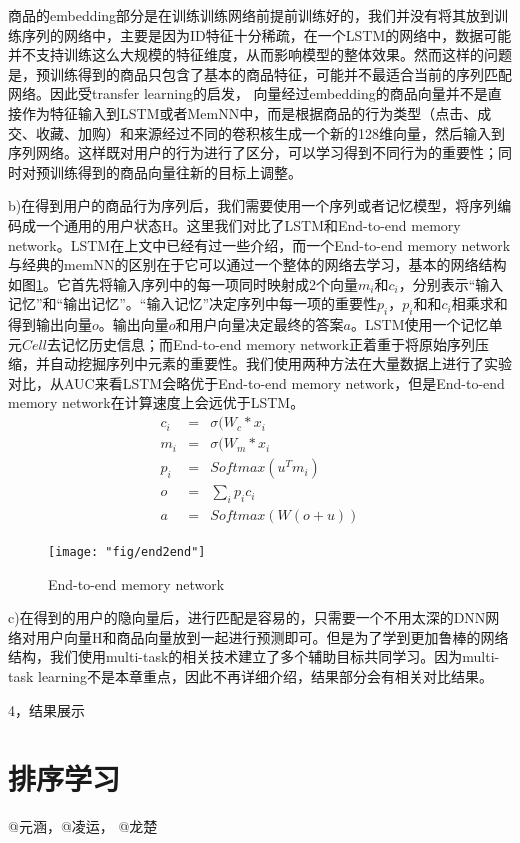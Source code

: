 商品的embedding部分是在训练训练网络前提前训练好的，我们并没有将其放到训练序列的网络中，主要是因为ID特征十分稀疏，在一个LSTM的网络中，数据可能并不支持训练这么大规模的特征维度，从而影响模型的整体效果。然而这样的问题是，预训练得到的商品只包含了基本的商品特征，可能并不最适合当前的序列匹配网络。因此受transfer learning的启发，
向量经过embedding的商品向量并不是直接作为特征输入到LSTM或者MemNN中，而是根据商品的行为类型（点击、成交、收藏、加购）和来源经过不同的卷积核生成一个新的128维向量，然后输入到序列网络。这样既对用户的行为进行了区分，可以学习得到不同行为的重要性；同时对预训练得到的商品向量往新的目标上调整。

b)在得到用户的商品行为序列后，我们需要使用一个序列或者记忆模型，将序列编码成一个通用的用户状态H。这里我们对比了LSTM和End-to-end memory network\cite{9}。LSTM在上文中已经有过一些介绍，而一个End-to-end memory network与经典的memNN的区别在于它可以通过一个整体的网络去学习，基本的网络结构如图\ref{fig:end2end}。它首先将输入序列中的每一项同时映射成2个向量$m_i$和$c_i$，分别表示“输入记忆”和“输出记忆”。“输入记忆”决定序列中每一项的重要性$p_i$，$p_i$和和$c_i$相乘求和得到输出向量$o$。输出向量$o$和用户向量决定最终的答案$a$。LSTM使用一个记忆单元$Cell$去记忆历史信息；而End-to-end memory network正着重于将原始序列压缩，并自动挖掘序列中元素的重要性。我们使用两种方法在大量数据上进行了实验对比，从AUC来看LSTM会略优于End-to-end memory network，但是End-to-end memory network在计算速度上会远优于LSTM。
\begin{eqnarray}
c_i &=& \sigma(W_{c} * x_{i}
\\
m_i &=& \sigma(W_{m} * x_{i}
\\
p_i &=& Softmax(u^T m_i)
\\
o &=& \sum_{i}p_i c_i
\\
a &=& Softmax(W(o+u))
\end{eqnarray}

\begin{figure}[h]
	\centering
	\texttt{[image: "fig/end2end"]}
	\caption{End-to-end memory network}
	\label{fig:end2end}
\end{figure}

c)在得到的用户的隐向量后，进行匹配是容易的，只需要一个不用太深的DNN网络对用户向量H和商品向量放到一起进行预测即可。但是为了学到更加鲁棒的网络结构，我们使用multi-task的相关技术\cite{16}建立了多个辅助目标共同学习。因为multi-task learning不是本章重点，因此不再详细介绍，结果部分会有相关对比结果。


4，结果展示
	
\section{排序学习}
	@元涵，@凌运， @龙楚
